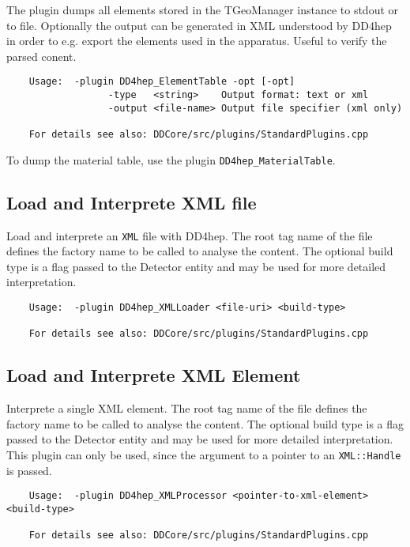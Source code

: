 The plugin dumps all elements stored in the TGeoManager instance to stdout or to file.
Optionally the output can be generated in XML understood by DD4hep in order to e.g.
export the elements used in the apparatus.
Useful to verify the parsed conent.
\begin{verbatim}
    Usage:  -plugin DD4hep_ElementTable -opt [-opt]
                  -type   <string>    Output format: text or xml
                  -output <file-name> Output file specifier (xml only)

    For details see also: DDCore/src/plugins/StandardPlugins.cpp
\end{verbatim}
To dump the material table, use the plugin \texttt{DD4hep\_MaterialTable}.

\subsection{Load and Interprete XML file}
\label{sec:dd4hep-manual-plugin-load-xml}

Load and interprete an \texttt{XML} file with DD4hep.
The root tag name of the file defines the factory name to be called
to analyse the content. The optional build type is a flag passed to the
Detector entity and may be used for more detailed interpretation.
\begin{verbatim}
    Usage:  -plugin DD4hep_XMLLoader <file-uri> <build-type>

    For details see also: DDCore/src/plugins/StandardPlugins.cpp
\end{verbatim}

\subsection{Load and Interprete XML Element}
\label{sec:dd4hep-manual-plugin-process-xml-element}

Interprete a single XML element.
The root tag name of the file defines the factory name to be called
to analyse the content. The optional build type is a flag passed to the
Detector entity and may be used for more detailed interpretation.
This plugin can only be used, since the argument to a pointer to an \texttt{XML::Handle}
is passed.
\begin{verbatim}
    Usage:  -plugin DD4hep_XMLProcessor <pointer-to-xml-element> <build-type>

    For details see also: DDCore/src/plugins/StandardPlugins.cpp
\end{verbatim}

